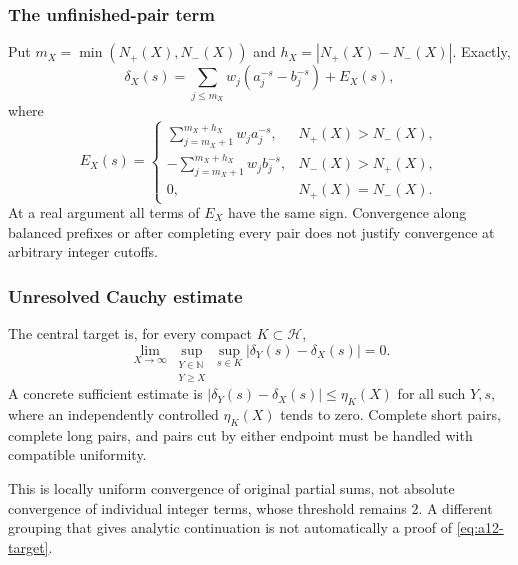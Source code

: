 \documentclass[11pt]{amsart}
\numberwithin{equation}{section}
\theoremstyle{plain}
\theoremstyle{definition}
\theoremstyle{remark}
\begin{document}
\subsubsection{The unfinished-pair term}
\label{subsubsec:a12-boundary}
Put $m_X=\min(N_+(X),N_-(X))$ and $h_X=|N_+(X)-N_-(X)|$. Exactly,
\begin{equation}
\label{eq:a12-boundary-split}
\delta_X(s)=\sum_{j\le m_X}w_j(a_j^{-s}-b_j^{-s})+E_X(s),
\end{equation}
where
\begin{equation}
\label{eq:a12-boundary-term}
E_X(s)=
\begin{cases}
\displaystyle\sum_{j=m_X+1}^{m_X+h_X}w_j a_j^{-s},
 &N_+(X)>N_-(X),\\[2mm]
\displaystyle-\sum_{j=m_X+1}^{m_X+h_X}w_j b_j^{-s},
 &N_-(X)>N_+(X),\\
0,&N_+(X)=N_-(X).
\end{cases}
\end{equation}
At a real argument all terms of $E_X$ have the same sign.
Convergence along balanced prefixes or after completing every pair does
not justify convergence at arbitrary integer cutoffs.

\subsubsection{Unresolved Cauchy estimate}
\label{subsubsec:a12-target}
The central target is, for every compact $K\subset\mathcal H$,
\begin{equation}
\label{eq:a12-target}
\boxed{\lim_{X\to\infty}
\sup_{\substack{Y\in\mathbb N\\Y\ge X}}
\sup_{s\in K}|\delta_Y(s)-\delta_X(s)|=0.}
\end{equation}
A concrete sufficient estimate is
$|\delta_Y(s)-\delta_X(s)|\le\eta_K(X)$ for all such $Y,s$, where an
independently controlled $\eta_K(X)$ tends to zero.
Complete short pairs, complete long pairs, and pairs cut by either endpoint
must be handled with compatible uniformity.

This is locally uniform convergence of original partial sums, not absolute
convergence of individual integer terms, whose threshold remains $2$.
A different grouping that gives analytic continuation is not automatically
a proof of \eqref{eq:a12-target}.
\end{document}
